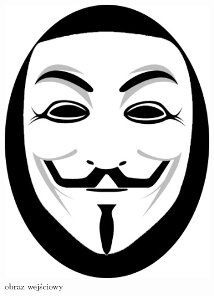 \begin{figure}[H]
\begin{subfigure}{0.24\textwidth}
            \includegraphics[width = \textwidth]{img/6-comp/fawkes_original_c20_inv0.png}
            \caption{obraz wejściowy\\\hphantom{ }\\\hphantom{ }\\\hphantom{ }}
            \label{comp-comp-dali-turing-fawkes-i}
        \end{subfigure}
        \begin{subfigure}{0.24\textwidth}
            \centering

\end{subfigure}
\end{figure}
